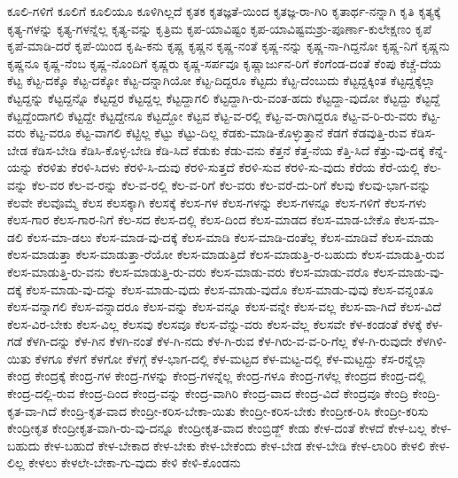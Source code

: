 {ಕೂಲಿ-ಗಳಿಗೆ
ಕೂಲಿಗೆ
ಕೂಲಿಯೂ
ಕೂಳಿಗಿಲ್ಲದೆ
ಕೃತಕ
ಕೃತಜ್ಞತೆ-ಯಿಂದ
ಕೃತಜ್ಞ-ರಾ-ಗಿರಿ
ಕೃತಾರ್ಥ-ನನ್ನಾಗಿ
ಕೃತಿ
ಕೃತ್ಯಕ್ಕೆ
ಕೃತ್ಯ-ಗಳನ್ನು
ಕೃತ್ಯ-ಗಳನ್ನೆಲ್ಲ
ಕೃತ್ಯ-ವನ್ನು
ಕೃತ್ರಿಮ
ಕೃಪ-ಯಾವಿಷ್ಟಂ
ಕೃಪ-ಯಾವಿಷ್ಟಮಶ್ರು-ಪೂರ್ಣಾ-ಕುಲೇಕ್ಷಣಂ
ಕೃಪೆ
ಕೃಪೆ-ಮಾಡಿ-ದರೆ
ಕೃಪೆ-ಯಿಂದ
ಕೃಷಿ-ಕನು
ಕೃಷ್ಣ
ಕೃಷ್ಣನ
ಕೃಷ್ಣ-ನಂತೆ
ಕೃಷ್ಣ-ನನ್ನು
ಕೃಷ್ಣ-ನಾ-ಗಿದ್ದನೋ
ಕೃಷ್ಣ-ನಿಗೆ
ಕೃಷ್ಣನು
ಕೃಷ್ಣನೂ
ಕೃಷ್ಣ-ನೆಂಬ
ಕೃಷ್ಣ-ನೊಂದಿಗೆ
ಕೃಷ್ಣರು
ಕೃಷ್ಣ-ಸರ್ಪವೂ
ಕೃಷ್ಣಾರ್ಜುನ-ರಿಗೆ
ಕೆಂಗೆಂಡ-ದಂತೆ
ಕೆಂಪು
ಕೆಚ್ಚೆ-ದೆಯ
ಕೆಟ್ಟ
ಕೆಟ್ಟ-ದಕ್ಕೊ
ಕೆಟ್ಟ-ದಕ್ಕೋ
ಕೆಟ್ಟ-ದನ್ನಾಗಿಯೋ
ಕೆಟ್ಟ-ದಿದ್ದರೂ
ಕೆಟ್ಟದು
ಕೆಟ್ಟ-ದೆಂಬುದು
ಕೆಟ್ಟದ್ದಕ್ಕಿಂತ
ಕೆಟ್ಟದ್ದಕ್ಕೆಲ್ಲಾ
ಕೆಟ್ಟದ್ದನ್ನು
ಕೆಟ್ಟದ್ದನ್ನೊ
ಕೆಟ್ಟದ್ದರ
ಕೆಟ್ಟದ್ದಲ್ಲ
ಕೆಟ್ಟದ್ದಾಗಲಿ
ಕೆಟ್ಟದ್ದಾಗಿ-ರು-ವಂತ-ಹದು
ಕೆಟ್ಟದ್ದಾ-ವುದೋ
ಕೆಟ್ಟದ್ದು
ಕೆಟ್ಟದ್ದೆ
ಕೆಟ್ಟದ್ದೆಂದಾಗಲಿ
ಕೆಟ್ಟದ್ದೇ
ಕೆಟ್ಟದ್ದೇನೂ
ಕೆಟ್ಟದ್ದೋ
ಕೆಟ್ಟವ
ಕೆಟ್ಟ-ವ-ರಲ್ಲಿ
ಕೆಟ್ಟ-ವ-ರಾಗಿದ್ದರೂ
ಕೆಟ್ಟ-ವ-ರಿ-ರು-ವರು
ಕೆಟ್ಟ-ವರು
ಕೆಟ್ಟ-ವರೂ
ಕೆಟ್ಟ-ವಾಗಲಿ
ಕೆಟ್ಟಿಲ್ಲ
ಕೆಟ್ಟು
ಕೆಟ್ಟು-ದಿಲ್ಲ
ಕೆಡಕು-ಮಾಡಿ-ಕೊಳ್ಳುತ್ತಾನೆ
ಕೆಡಗೆ
ಕೆಡವುತ್ತಿ-ರುವ
ಕೆಡಿಸ-ಬೇಡ
ಕೆಡಿಸ-ಬೇಡಿ
ಕೆಡಿಸಿ-ಕೊಳ್ಳ-ಬೇಡಿ
ಕೆಡಿ-ಸಿದೆ
ಕೆಡುಕು
ಕೆಡು-ವನು
ಕೆತ್ತನೆ
ಕೆತ್ತ-ನೆಯ
ಕೆತ್ತಿ-ಸಿದೆ
ಕೆತ್ತು-ವು-ದಕ್ಕೆ
ಕೆನ್ನೆ-ಯನ್ನು
ಕೆರಳಿತು
ಕೆರಳಿ-ಸಿದಳು
ಕೆರಳಿ-ಸಿ-ದುವು
ಕೆರಳಿ-ಸುತ್ತದೆ
ಕೆರಳಿ-ಸುವ
ಕೆರಳಿ-ಸು-ವುದು
ಕೆರೆಯ
ಕೆರೆ-ಯಲ್ಲಿ
ಕೆಲ-ವನ್ನು
ಕೆಲ-ವರ
ಕೆಲ-ವ-ರನ್ನು
ಕೆಲ-ವ-ರಲ್ಲಿ
ಕೆಲ-ವ-ರಿಗೆ
ಕೆಲ-ವರು
ಕೆಲ-ವರೆ-ದು-ರಿಗೆ
ಕೆಲವು
ಕೆಲವು-ಭಾಗ-ವನ್ನು
ಕೆಲವೇ
ಕೆಲವೊಮ್ಮೆ
ಕೆಲಸ
ಕೆಲಸಕ್ಕಾಗಿ
ಕೆಲಸಕ್ಕೆ
ಕೆಲಸ-ಗಳ
ಕೆಲಸ-ಗಳನ್ನು
ಕೆಲಸ-ಗಳನ್ನೂ
ಕೆಲಸ-ಗಳಿಗೆ
ಕೆಲಸ-ಗಳು
ಕೆಲಸ-ಗಾರ
ಕೆಲಸ-ಗಾರ-ನಿಗೆ
ಕೆಲ-ಸದ
ಕೆಲಸ-ದಲ್ಲಿ
ಕೆಲಸ-ದಿಂದ
ಕೆಲಸ-ಮಾಡದ
ಕೆಲಸ-ಮಾಡ-ಬೇಕೊ
ಕೆಲಸ-ಮಾ-ಡಲಿ
ಕೆಲಸ-ಮಾ-ಡಲು
ಕೆಲಸ-ಮಾಡ-ವು-ದಕ್ಕೆ
ಕೆಲಸ-ಮಾಡಿ
ಕೆಲಸ-ಮಾಡಿ-ದಂತೆಲ್ಲ
ಕೆಲಸ-ಮಾಡಿವೆ
ಕೆಲಸ-ಮಾಡು
ಕೆಲಸ-ಮಾಡುತ್ತಾ
ಕೆಲಸ-ಮಾಡುತ್ತಾ-ರೆಯೋ
ಕೆಲಸ-ಮಾಡುತ್ತಿದೆ
ಕೆಲಸ-ಮಾಡುತ್ತಿ-ರ-ಬಹುದು
ಕೆಲಸ-ಮಾಡುತ್ತಿ-ರುವ
ಕೆಲಸ-ಮಾಡುತ್ತಿ-ರು-ವನು
ಕೆಲಸ-ಮಾಡುತ್ತಿ-ರು-ವರು
ಕೆಲಸ-ಮಾಡು-ವರು
ಕೆಲಸ-ಮಾಡು-ವರೊ
ಕೆಲಸ-ಮಾಡು-ವು-ದಕ್ಕೆ
ಕೆಲಸ-ಮಾಡು-ವು-ದನ್ನು
ಕೆಲಸ-ಮಾಡು-ವುದು
ಕೆಲಸ-ಮಾಡು-ವುದೊ
ಕೆಲಸ-ಮಾಡು-ವುವು
ಕೆಲಸ-ವನ್ನಂತೂ
ಕೆಲಸ-ವನ್ನಾಗಲಿ
ಕೆಲಸ-ವನ್ನಾದರೂ
ಕೆಲಸ-ವನ್ನು
ಕೆಲಸ-ವನ್ನೂ
ಕೆಲಸ-ವನ್ನೇ
ಕೆಲಸ-ವಲ್ಲ
ಕೆಲಸ-ವಾ-ಗಿದೆ
ಕೆಲಸ-ವಿದೆ
ಕೆಲಸ-ವಿರ-ಬೇಕು
ಕೆಲಸ-ವಿಲ್ಲ
ಕೆಲಸವು
ಕೆಲಸವೂ
ಕೆಲಸ-ವೆನ್ನು-ವರು
ಕೆಲಸ-ವೆಲ್ಲ
ಕೆಲಸವೇ
ಕೆಳ-ಕಂಡಂತೆ
ಕೆಳಕ್ಕೆ
ಕೆಳ-ಗಡೆ
ಕೆಳಗಿ-ದನ್ನು
ಕೆಳ-ಗಿನ
ಕೆಳಗಿ-ನಂತೆ
ಕೆಳ-ಗಿ-ನದು
ಕೆಳ-ಗಿ-ರುವ
ಕೆಳ-ಗಿರು-ವ-ವ-ರಿ-ಗೆಲ್ಲ
ಕೆಳ-ಗಿ-ರುವುದೇ
ಕೆಳಗಿಳಿ-ಯಿತು
ಕೆಳಗೂ
ಕೆಳಗೆ
ಕೆಳಗೋ
ಕೆಳಗ್ಗೆ
ಕೆಳ-ಭಾಗ-ದಲ್ಲಿ
ಕೆಳ-ಮಟ್ಟದ
ಕೆಳ-ಮಟ್ಟ-ದಲ್ಲಿ
ಕೆಳ-ಮಟ್ಟದ್ದು
ಕೆಸ-ರನ್ನೆಲ್ಲಾ
ಕೇಂದ್ರ
ಕೇಂದ್ರಕ್ಕೆ
ಕೇಂದ್ರ-ಗಳ
ಕೇಂದ್ರ-ಗಳನ್ನು
ಕೇಂದ್ರ-ಗಳನ್ನೆಲ್ಲ
ಕೇಂದ್ರ-ಗಳೂ
ಕೇಂದ್ರ-ಗಳೆಲ್ಲ
ಕೇಂದ್ರದ
ಕೇಂದ್ರ-ದಲ್ಲಿ
ಕೇಂದ್ರ-ದಲ್ಲಿ-ರುವ
ಕೇಂದ್ರ-ದಿಂದ
ಕೇಂದ್ರ-ವನ್ನು
ಕೇಂದ್ರ-ವಾಗಿರಿ
ಕೇಂದ್ರ-ವಾದ
ಕೇಂದ್ರ-ವಿದೆ
ಕೇಂದ್ರವೂ
ಕೇಂದ್ರಿ
ಕೇಂದ್ರಿ-ಕೃತ-ವಾ-ಗಿದೆ
ಕೇಂದ್ರಿ-ಕೃತ-ವಾದ
ಕೇಂದ್ರೀ-ಕರಿಸ-ಬೇಕಾ-ಯಿತು
ಕೇಂದ್ರೀ-ಕರಿಸ-ಬೇಕು
ಕೇಂದ್ರೀಕ-ರಿಸಿ
ಕೇಂದ್ರೀ-ಕರಿಸು
ಕೇಂದ್ರೀಕೃತ
ಕೇಂದ್ರೀಕೃತ-ವಾಗಿ-ರು-ವು-ದನ್ನೂ
ಕೇಂದ್ರೀಕೃತ-ವಾದ
ಕೇಂಬ್ರಿಡ್ಜ್
ಕೇಡು
ಕೇಳ-ದಂತೆ
ಕೇಳದೆ
ಕೇಳ-ಬಲ್ಲ
ಕೇಳ-ಬಹುದು
ಕೇಳ-ಬಹುದೆ
ಕೇಳ-ಬೇಕಾದ
ಕೇಳ-ಬೇಕು
ಕೇಳ-ಬೇಕೆಂದು
ಕೇಳ-ಬೇಡ
ಕೇಳ-ಬೇಡಿ
ಕೇಳ-ಲಾರಿರಿ
ಕೇಳಲಿ
ಕೇಳ-ಲಿಲ್ಲ
ಕೇಳಲು
ಕೇಳಲೇ-ಬೇಕಾ-ಗು-ವುದು
ಕೇಳಿ
ಕೇಳಿ-ಕೊಂಡನು
}
